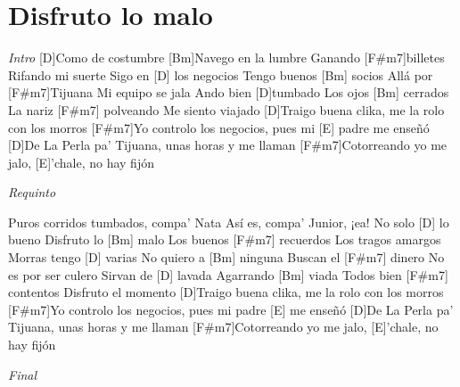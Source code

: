\section{Disfruto lo malo}

\noindent
\vspace{1cm}

\begin{guitar}
	\begin{multicols}{2}

		\textit{Intro}
		[D]Como de costumbre
		[Bm]Navego en la lumbre
		Ganando [F#m7]billetes
		Rifando mi suerte
		Sigo en [D] los negocios
		Tengo buenos [Bm] socios
		Allá por [F#m7]Tijuana
		Mi equipo se jala
		Ando bien [D]tumbado
		Los ojos [Bm] cerrados
		La nariz [F#m7] polveando
		Me siento viajado
		[D]Traigo buena clika, me la rolo con los morros
		[F#m7]Yo controlo los negocios, pues mi [E] padre me enseñó
		[D]De La Perla pa' Tijuana, unas horas y me llaman
		[F#m7]Cotorreando yo me jalo, [E]'chale, no hay fijón

		\textit{Requinto} 
		\par
		Puros corridos tumbados, compa' Nata
		Así es, compa' Junior, ¡ea!
		No solo [D] lo bueno
		Disfruto lo [Bm] malo
		Los buenos [F#m7] recuerdos
		Los tragos amargos
		Morras tengo [D] varias
		No quiero a [Bm] ninguna
		Buscan el [F#m7] dinero
		No es por ser culero
		Sirvan de [D] lavada
		Agarrando [Bm] viada
		Todos bien [F#m7] contentos
		Disfruto el momento
		[D]Traigo buena clika, me la rolo con los morros
		[F#m7]Yo controlo los negocios, pues mi padre [E] me enseñó
		[D]De La Perla pa' Tijuana, unas horas y me llaman
		[F#m7]Cotorreando yo me jalo, [E]'chale, no hay fijón

	\textit{Final}
	\end{multicols}
\end{guitar}
